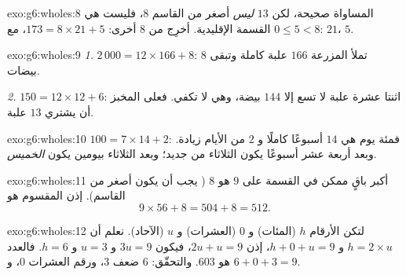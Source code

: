 \begin{solution}{exo:g6:wholes:8}
المساواة صحيحة، لكن  $13$ \emph{ليس} أصغر من
القاسم $8$، فليست هي القسمة الإقليدية. أخرِج من 
$8$ أخرى: $173 = 8 \times 21 + 5$، مع $0 \leq 5 < 8$:
 $21$،  $5$.
\end{solution}

\begin{solution}{exo:g6:wholes:9}
\emph{1.} $2\,000 = 12 \times 166 + 8$: تملأ المزرعة $166$ علبة
كاملة وتبقى $8$ بيضات.

\emph{2.} $150 = 12 \times 12 + 6$: اثنتا عشرة علبة لا تسع إلا $144$
بيضة، وهي لا تكفي. فعلى المخبز أن يشتري $13$ علبة.
\end{solution}

\begin{solution}{exo:g6:wholes:10}
$100 = 7 \times 14 + 2$: فمئة يوم هي $14$ أسبوعًا كاملًا و $2$ من
الأيام زيادة. وبعد أربعة عشر أسبوعًا يكون الثلاثاء من جديد؛ وبعد
الثلاثاء بيومين يكون \emph{الخميس}.
\end{solution}

\begin{solution}{exo:g6:wholes:11}
أكبر باقٍ ممكن في القسمة على $9$ هو $8$ (
يجب أن يكون أصغر من القاسم). إذن المقسوم هو
\[
9 \times 56 + 8 = 504 + 8 = 512 .
\]
\end{solution}

\begin{solution}{exo:g6:wholes:12}
لتكن الأرقام $h$ (المئات) و $0$ (العشرات) و $u$ (الآحاد). نعلم أن
$h = 2 \times u$ و $h + 0 + u = 9$، إذن $2u + u = 9$، فيكون
$3u = 9$ و $u = 3$ و $h = 6$. فالعدد هو $603$. والتحقّق: $6$ ضعف
$3$، ورقم العشرات $0$، و $6 + 0 + 3 = 9$.
\end{solution}

